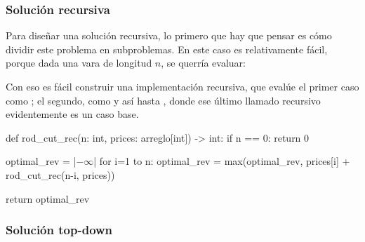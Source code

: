 \subsubsection{Solución recursiva}
\label{sec:corte_vara_recursiva}

Para diseñar una solución recursiva, lo primero que hay que pensar es cómo dividir este problema en subproblemas. En este caso es relativamente fácil, porque dada una vara de longitud \(n\), se querría evaluar:

Con eso es fácil construir una implementación recursiva,  que evalúe el primer caso como ; el segundo, como  y así hasta , donde ese último llamado recursivo evidentemente es un caso base.
\begin{codeblock}
\begin{pseudocode}
def rod_cut_rec(n: int, prices: arreglo[int]) -> int:
    if n == 0: return 0

    optimal_rev = |\(-\infty\)|
    for i=1 to n:
        optimal_rev = max(optimal_rev, prices[i] + rod_cut_rec(n-i, prices))

    return optimal_rev
\end{pseudocode}
\end{codeblock}

\subsubsection{Solución top-down}
\label{sec:corte_vara_top_down}

